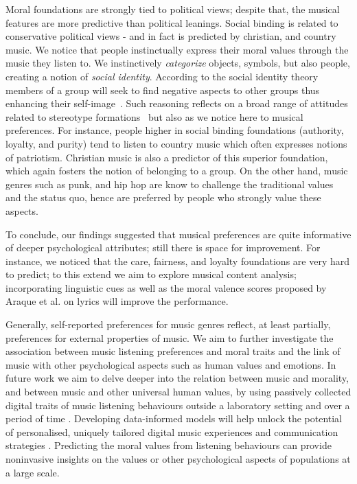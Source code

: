 \documentclass{article}
\begin{document}
Moral foundations are strongly tied to political views; despite that, the musical features are more predictive than political leanings.
Social binding is related to conservative political views \cite{graham2009liberals} - and in fact is predicted by christian, and country music. 
We notice that people instinctually express their moral values through the music they listen to. 
We instinctively  \textit{categorize} objects, symbols, but also people,  
creating a notion of \textit{social identity}.
According to the social identity theory members of a group will seek to find negative aspects to other groups thus enhancing their self-image~\cite{tajfel1979integrative}.
Such reasoning reflects on a broad range of attitudes related to stereotype formations~\cite{miller2010self} but also as we notice here to musical preferences.
For instance, people higher in social binding foundations (authority, loyalty, and purity) tend to listen to country music which often expresses notions of patriotism. Christian music is also a predictor of this superior foundation, which again fosters the notion of belonging to a group. On the other hand, music genres such as punk, and hip hop are know to challenge the traditional values and the status quo, hence are preferred by people who strongly value these aspects.


To conclude, our findings suggested that musical preferences are quite informative of deeper psychological attributes; still there is space for improvement. For instance, we noticed that the care, fairness, and loyalty foundations are very hard to predict; to this extend we aim to explore  musical content analysis; incorporating linguistic cues as well as the moral valence scores proposed by Araque et al. \cite{araque2020moralstrength} on lyrics will improve the performance. 

Generally,  self-reported preferences for music genres reflect, at least partially, preferences for external properties of music. We aim to further investigate the association between music listening preferences and moral traits and the link of music with other psychological aspects such as human values and emotions. 
In future work we aim to delve deeper into the relation between music and morality, and between music and other universal human values, by using passively collected digital traits of music listening behaviours outside a laboratory setting and over a period of time \cite{anderson2020just}.
Developing data-informed models will help unlock the potential of personalised, uniquely tailored digital music experiences and communication strategies \cite{kalimeri2019predicting,anderson2020algorithmic}. Predicting the moral values from listening behaviours can provide noninvasive insights on the values or other psychological aspects of populations at a large scale.
\end{document}
